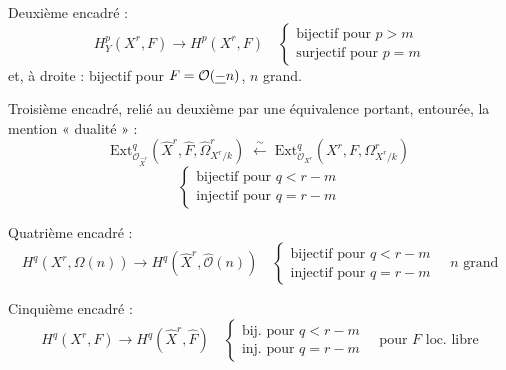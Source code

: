 \documentclass[11pt,a4paper]{article}
\begin{document}
Deuxième encadré :
\[
  H^{p}_{Y}(X^{r}, F) \longrightarrow H^{p}(X^{r}, F) \quad
  \begin{cases}
    \text{bijectif pour } p > m \\
    \text{surjectif pour } p = m
  \end{cases}
\]
et, à droite :  bijectif pour $F = \mathcal{O}(\uncertain{-}n)$,
$n$ grand.


Troisième encadré, relié au deuxième par une équivalence portant, entourée, la
mention « dualité » :
\[
  \mathrm{Ext}^{q}_{\mathcal{O}_{\hat{X}^{r}}}
    \!\left(\hat{X}^{r}, \hat{F}, \hat{\Omega}^{r}_{X^{r}/k}\right)
  \;\xleftarrow{\ \sim\ }\;
  \mathrm{Ext}^{q}_{\mathcal{O}_{X^{r}}}
    \!\left(X^{r}, F, \Omega^{r}_{X^{r}/k}\right)
\]
\[
  \begin{cases}
    \text{bijectif pour } q < r - m \\
    \text{injectif pour } q = r - m
  \end{cases}
\]


Quatrième encadré :
\[
  H^{q}\!\left(X^{r}, \Omega(n)\right) \longrightarrow
  H^{q}\!\left(\hat{X}^{r}, \hat{\mathcal{O}}(n)\right) \quad
  \begin{cases}
    \text{bijectif pour } q < r - m \\
    \text{injectif pour } q = r - m
  \end{cases}
  \quad n \text{ grand}
\]

Cinquième encadré :
\[
  H^{q}(X^{r}, F) \longrightarrow H^{q}(\hat{X}^{r}, \hat{F}) \quad
  \begin{cases}
    \text{bij. pour } q < r - m \\
    \text{inj. pour } q = r - m
  \end{cases}
  \quad \text{pour } F \text{ loc. libre}
\]


\end{document}
